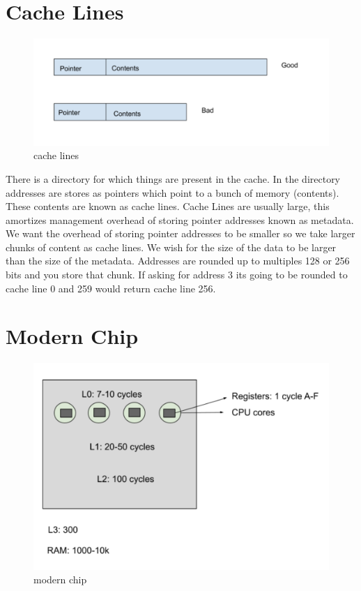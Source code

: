 \documentclass[twoside]{article}
\begin{document}
\section{Cache Lines}
\begin{figure}[h!]
  \includegraphics[width=\linewidth]{fig2.png}
  \caption{cache lines}
  \label{fig:fig2}
\end{figure}
There is a directory for which things are present in the cache. In the directory addresses are stores as pointers which point to a bunch of memory (contents). These contents are known as cache lines. Cache Lines are usually large, this amortizes management overhead of storing pointer addresses known as metadata. We want the overhead of storing pointer addresses to be smaller so we take larger chunks of content as cache lines. We wish for the size of the data to be larger than the size of the metadata. 
\newline
Addresses are rounded up to multiples 128 or 256 bits and you store that chunk. If asking for address 3 its going to be rounded to cache line 0 and 259 would return cache line 256. 
\section{Modern Chip}
\begin{figure}[h!]
  \includegraphics[width=\linewidth]{fig3.png}
  \caption{modern chip}
  \label{fig:fig3}
\end{figure}
\end{document}
